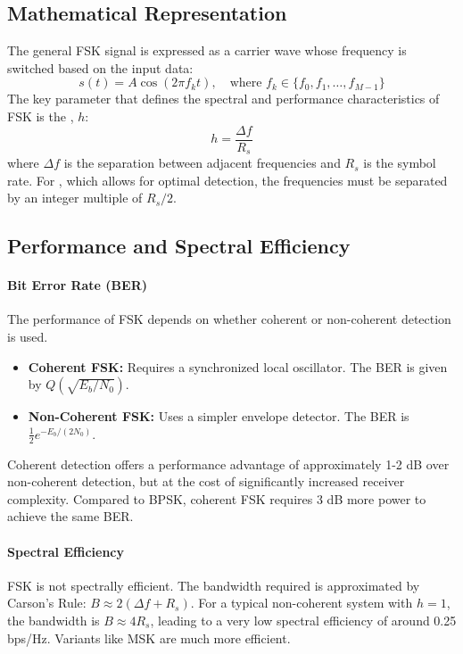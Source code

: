 \subsection{Mathematical Representation}

The general FSK signal is expressed as a carrier wave whose frequency is switched based on the input data:
\begin{equation}
    s(t) = A \cos\left(2\pi f_k t\right), \quad \text{where } f_k \in \{f_0, f_1, \dots, f_{M-1}\}
\end{equation}
The key parameter that defines the spectral and performance characteristics of FSK is the , $h$:
\begin{equation}
    h = \frac{\Delta f}{R_s}
\end{equation}
where $\Delta f$ is the separation between adjacent frequencies and $R_s$ is the symbol rate. For , which allows for optimal detection, the frequencies must be separated by an integer multiple of $R_s/2$.


\subsection{Performance and Spectral Efficiency}

\paragraph{Bit Error Rate (BER)}
The performance of FSK depends on whether coherent or non-coherent detection is used.
\begin{itemize}
    \item \textbf{Coherent FSK:} Requires a synchronized local oscillator. The BER is given by $Q\left(\sqrt{E_b/N_0}\right)$.
    \item \textbf{Non-Coherent FSK:} Uses a simpler envelope detector. The BER is $\frac{1}{2}e^{-E_b/(2N_0)}$.
\end{itemize}
Coherent detection offers a performance advantage of approximately 1-2 dB over non-coherent detection, but at the cost of significantly increased receiver complexity. Compared to BPSK, coherent FSK requires 3 dB more power to achieve the same BER.

\paragraph{Spectral Efficiency}
FSK is not spectrally efficient. The bandwidth required is approximated by Carson's Rule: $B \approx 2(\Delta f + R_s)$. For a typical non-coherent system with $h=1$, the bandwidth is $B \approx 4R_s$, leading to a very low spectral efficiency of around 0.25 bps/Hz. Variants like MSK are much more efficient.


